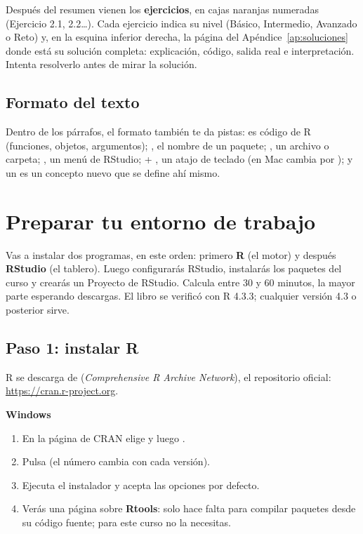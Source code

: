 Después del resumen vienen los \textbf{ejercicios}, en cajas naranjas
numeradas (Ejercicio 2.1, 2.2\ldots). Cada ejercicio indica su nivel
(Básico, Intermedio, Avanzado o Reto) y, en la esquina inferior derecha, la
página del Apéndice~\ref{ap:soluciones} donde está su solución completa:
explicación, código, salida real e interpretación. Intenta resolverlo
antes de mirar la solución.

\subsection{Formato del texto}

Dentro de los párrafos, el formato también te da pistas:
 es código de R (funciones, objetos, argumentos);
, el nombre de un paquete; , un
archivo o carpeta; , un menú de RStudio;
 + , un atajo de teclado (en Mac cambia
 por ); y un  es un
concepto nuevo que se define ahí mismo.

\section{Preparar tu entorno de trabajo}
\label{sec:m0-entorno}

Vas a instalar dos programas, en este orden: primero \textbf{R} (el motor)
y después \textbf{RStudio} (el tablero). Luego configurarás RStudio,
instalarás los paquetes del curso y crearás un Proyecto de RStudio. Calcula
entre 30 y 60 minutos, la mayor parte esperando descargas. El libro se
verificó con R 4.3.3; cualquier versión 4.3 o posterior sirve.

\subsection{Paso 1: instalar R}

R se descarga de  (\textit{Comprehensive R Archive
Network}), el repositorio oficial: \url{https://cran.r-project.org}.

\textbf{Windows}
\begin{enumerate}
  \item En la página de CRAN elige  y luego
        .
  \item Pulsa  (el número cambia con
        cada versión).
  \item Ejecuta el instalador  y acepta las opciones por
        defecto.
  \item Verás una página sobre \textbf{Rtools}: solo hace falta para
        compilar paquetes desde su código fuente; para este curso no la
        necesitas.
\end{enumerate}


